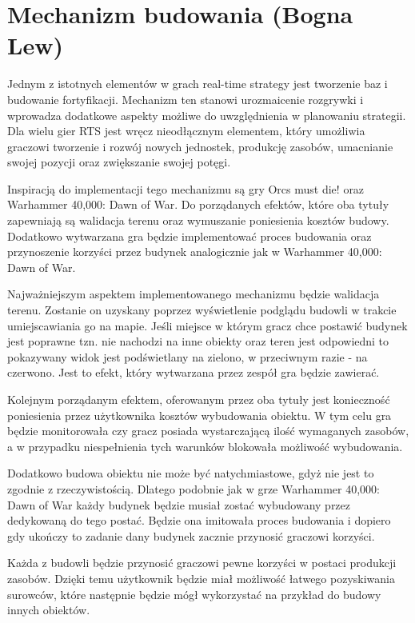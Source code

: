 \section{Mechanizm budowania (Bogna Lew)}\label{chap:build}
Jednym z istotnych elementów w grach real-time strategy jest tworzenie baz i budowanie fortyfikacji. Mechanizm ten
stanowi urozmaicenie rozgrywki i wprowadza dodatkowe aspekty możliwe do uwzględnienia w planowaniu strategii. Dla wielu
gier RTS jest wręcz nieodłącznym elementem, który umożliwia graczowi tworzenie i rozwój nowych jednostek, produkcję
zasobów, umacnianie swojej pozycji oraz zwiększanie swojej potęgi.

Inspiracją do implementacji tego mechanizmu są gry Orcs must die! oraz Warhammer 40,000: Dawn of War. Do porządanych
efektów, które oba tytuły zapewniają są walidacja terenu oraz wymuszanie poniesienia kosztów budowy. Dodatkowo
wytwarzana gra będzie implementować proces budowania oraz przynoszenie korzyści przez budynek analogicznie jak w
Warhammer 40,000: Dawn of War.

Najważniejszym aspektem implementowanego mechanizmu będzie walidacja terenu. Zostanie on uzyskany poprzez wyświetlenie
podglądu budowli w trakcie umiejscawiania go na mapie. Jeśli miejsce w którym gracz chce postawić budynek jest poprawne
tzn. nie nachodzi na inne obiekty oraz teren jest odpowiedni to pokazywany widok jest podświetlany na zielono, w
przeciwnym razie - na czerwono. Jest to efekt, który wytwarzana przez zespół gra będzie zawierać.

Kolejnym porządanym efektem, oferowanym przez oba tytuły jest konieczność poniesienia przez użytkownika kosztów
wybudowania obiektu. W tym celu gra będzie monitorowała czy gracz posiada wystarczającą ilość wymaganych zasobów, a w
przypadku niespełnienia tych warunków blokowała możliwość wybudowania.

Dodatkowo budowa obiektu nie może być natychmiastowe, gdyż nie jest to zgodnie z rzeczywistością. Dlatego podobnie jak w
grze Warhammer 40,000: Dawn of War każdy budynek będzie musiał zostać wybudowany przez dedykowaną do tego postać. Będzie
ona imitowała proces budowania i dopiero gdy ukończy to zadanie dany budynek zacznie przynosić graczowi korzyści.

Każda z budowli będzie przynosić graczowi pewne korzyści w postaci produkcji zasobów. Dzięki temu użytkownik będzie miał
możliwość łatwego pozyskiwania surowców, które następnie będzie mógł wykorzystać na przykład do budowy innych obiektów.
